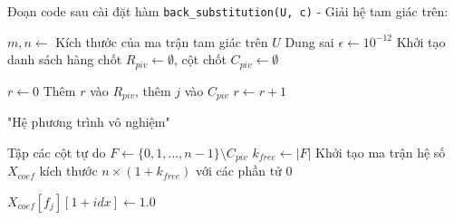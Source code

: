 Đoạn code sau cài đặt hàm \texttt{back\_substitution(U, c)} -  Giải hệ tam giác trên:

\begin{algorithm}[H]
\caption{Quá trình Thế ngược (Back Substitution) - Phần 1: Tiền xử lý}
\label{alg:back_substitution_1}
\begin{algorithmic}[1]
    \State $m, n \gets$ Kích thước của ma trận tam giác trên $U$
    \State Dung sai $\epsilon \gets 10^{-12}$
    \State Khởi tạo danh sách hàng chốt $R_{piv} \gets \emptyset$, cột chốt $C_{piv} \gets \emptyset$
    
    \State {}
    \State $r \gets 0$
            \State Thêm $r$ vào $R_{piv}$, thêm $j$ vào $C_{piv}$
            \State $r \gets r + 1$
        \EndIf
    \EndFor
    
    \State {}
     
            \State \Return "Hệ phương trình vô nghiệm"
        \EndIf
    \EndFor
    
    \State {}
    \State Tập các cột tự do $F \gets \{0, 1, \dots, n-1\} \setminus C_{piv}$
    \State $k_{free} \gets |F|$ 
    \State Khởi tạo ma trận hệ số $X_{coef}$ kích thước $n \times (1 + k_{free})$ với các phần tử $0$
    
        \State $X_{coef}[f_j][1 + idx] \gets 1.0$ 
    \EndFor
    
    \State {}
\EndProcedure
\end{algorithmic}
\end{algorithm}

\newpage %

